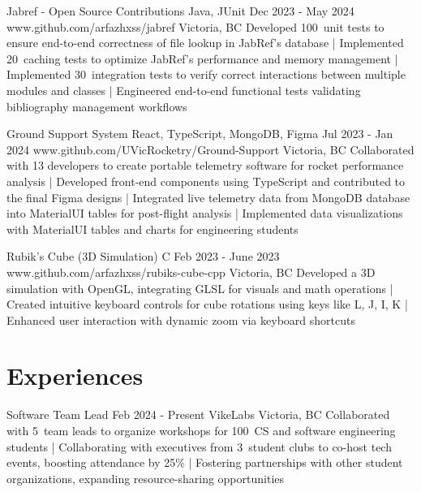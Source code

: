 \documentclass[a4paper,10pt]{article}
\begin{document}

\projectentry
{Jabref - Open Source Contributions}
{Java, JUnit}
{Dec 2023 - May 2024}
{www.github.com/arfazhxss/jabref}
{Victoria, BC}
{Developed 100\plus\ unit tests to ensure end-to-end correctness of file lookup in JabRef's database
| Implemented 20\plus\ caching tests to optimize JabRef's performance and memory management
| Implemented 30\plus\ integration tests to verify correct interactions between multiple modules and classes
| Engineered end-to-end functional tests validating bibliography management workflows
}

\projectentry
{Ground Support System}
{React, TypeScript, MongoDB, Figma}
{Jul 2023 - Jan 2024}
{www.github.com/UVicRocketry/Ground-Support}
{Victoria, BC}
{Collaborated with 13 developers to create portable telemetry software for rocket performance analysis 
| Developed front-end components using TypeScript and contributed to the final Figma designs
| Integrated live telemetry data from MongoDB database into MaterialUI tables for post-flight analysis
| Implemented data visualizations with MaterialUI tables and charts for engineering students 
}

\projectentry
{Rubik's Cube (3D Simulation)}
{C\plus\plus}
{Feb 2023 - June 2023}
{www.github.com/arfazhxss/rubiks-cube-cpp}
{Victoria, BC}
{Developed a 3D simulation with OpenGL, integrating GLSL for visuals and math operations 
| Created intuitive keyboard controls for cube rotations using keys like L, J, I, K 
| Enhanced user interaction with dynamic zoom via keyboard shortcuts
}

\section{Experiences}
\relevantexperience
{Software Team Lead}
{Feb 2024 - Present}
{VikeLabs}
{Victoria, BC}
{Collaborated with 5\plus\ team leads to organize workshops for 100\plus\ CS and software engineering students 
| Collaborating with executives from 3\plus\ student clubs to co-host tech events, boosting attendance by 25\% 
| Fostering partnerships with other student organizations, expanding resource-sharing opportunities 
}
\end{document}
